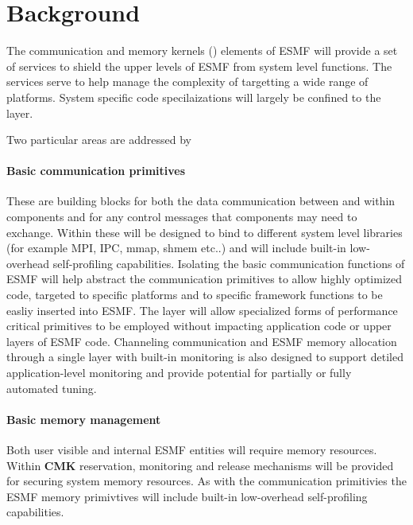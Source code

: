 
\section{Background}

The communication and memory kernels ({\bf \shortname}) elements of ESMF 
will provide a set of services to shield the upper levels of ESMF from system
level functions. The {\bf \shortname} services serve to help
manage the complexity of targetting a wide range of platforms.
System specific code specilaizations will largely be confined 
to the {\bf \shortname} layer.

Two particular areas are addressed by {\bf \shortname}
\paragraph {\bf Basic communication primitives} These are building blocks for 
both the data communication between and within components and for any
control messages that components may need to exchange. Within {\bf \shortname}
these will be designed to bind to different system level libraries
(for example MPI, IPC, mmap, shmem etc..) and will include built-in
low-overhead self-profiling capabilities.
Isolating the basic communication functions of ESMF will help
abstract the communication primitives to allow highly optimized code,
targeted to specific platforms and to specific framework functions
to be easliy inserted into ESMF. The {\bf \shortname}
layer will allow specialized forms of performance critical
primitives to be employed without impacting application
code or upper layers of ESMF code.
Channeling communication and ESMF memory allocation through a single
layer with built-in monitoring
is also designed to support detiled application-level monitoring and
provide potential for partially or fully automated tuning.


\paragraph {\bf Basic memory management} Both user visible and internal
ESMF entities will require memory resources. Within {\bf CMK} reservation,
 monitoring and release mechanisms will be provided for securing system 
memory resources. As with the communication primitivies the
ESMF memory primivtives will include built-in low-overhead self-profiling 
capabilities.


